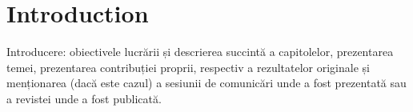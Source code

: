 \chapter{Introduction}

\label{intro}

\par Introducere: obiectivele lucrării și descrierea succintă a capitolelor, prezentarea temei, prezentarea contribuției proprii, respectiv a rezultatelor originale și menționarea (dacă este cazul) a sesiunii de comunicări unde a fost prezentată sau a revistei unde a fost publicată.